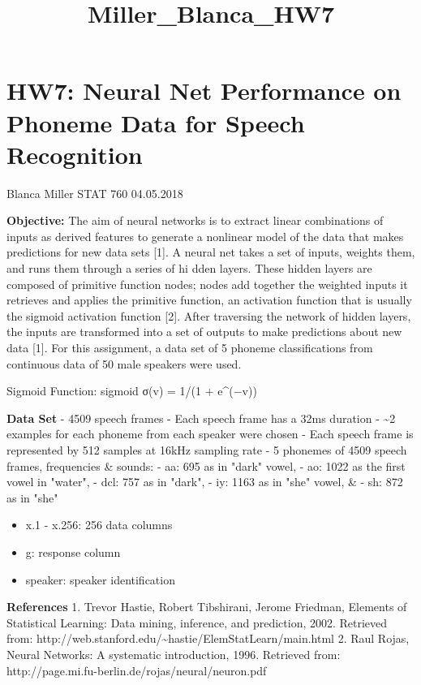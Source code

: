 \documentclass[11pt]{article}
\title{Miller\_Blanca\_HW7}
\providecommand{\tightlist}{%
      \setlength{\itemsep}{0pt}\setlength{\parskip}{0pt}}
\begin{document}
    
    
    \maketitle
    
    

    
    \section{HW7: Neural Net Performance on Phoneme Data for Speech
Recognition}\label{hw7-neural-net-performance-on-phoneme-data-for-speech-recognition}

    Blanca Miller STAT 760 04.05.2018 

    \textbf{Objective:} The aim of neural networks is to extract linear
combinations of inputs as derived features to generate a nonlinear model
of the data that makes predictions for new data sets {[}1{]}. A neural
net takes a set of inputs, weights them, and runs them through a series
of hi dden layers. These hidden layers are composed of primitive
function nodes; nodes add together the weighted inputs it retrieves and
applies the primitive function, an activation function that is usually
the sigmoid activation function {[}2{]}. After traversing the network of
hidden layers, the inputs are transformed into a set of outputs to make
predictions about new data {[}1{]}. For this assignment, a data set of 5
phoneme classifications from continuous data of 50 male speakers were
used.

Sigmoid Function: sigmoid σ(v) = 1/(1 + e\^{}(−v))

\textbf{Data Set} - 4509 speech frames - Each speech frame has a 32ms
duration - \textasciitilde{}2 examples for each phoneme from each
speaker were chosen - Each speech frame is represented by 512 samples at
16kHz sampling rate - 5 phonemes of 4509 speech frames, frequencies \&
sounds: - aa: 695 as in "dark" vowel, - ao: 1022 as the first vowel in
"water", - dcl: 757 as in "dark", - iy: 1163 as in "she" vowel, \& - sh:
872 as in "she"

\begin{itemize}
\tightlist
\item
  x.1 - x.256: 256 data columns
\item
  g: response column
\item
  speaker: speaker identification
\end{itemize}

\textbf{References} 1. Trevor Hastie, Robert Tibshirani, Jerome
Friedman, Elements of Statistical Learning: Data mining, inference, and
prediction, 2002. Retrieved from:
http://web.stanford.edu/\textasciitilde{}hastie/ElemStatLearn/main.html
2. Raul Rojas, Neural Networks: A systematic introduction, 1996.
Retrieved from: http://page.mi.fu-berlin.de/rojas/neural/neuron.pdf
\end{document}
